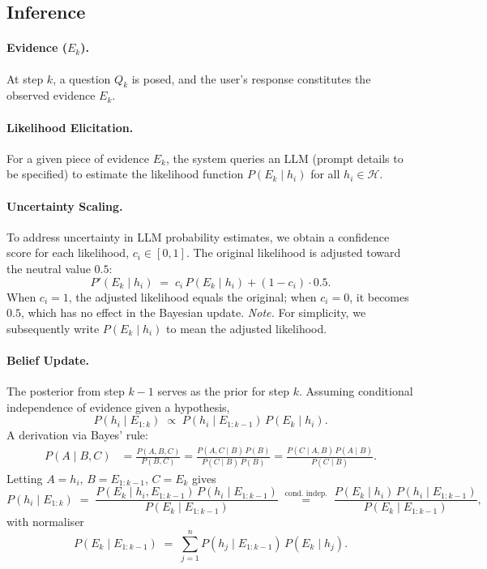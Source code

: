 \documentclass{article} %
\begin{document}
\subsection{Inference}
\paragraph{Evidence ($E_k$).}
At step $k$, a question $Q_k$ is posed, and the user's response constitutes the observed evidence $E_k$.

\paragraph{Likelihood Elicitation.}
For a given piece of evidence $E_k$, the system queries an LLM (prompt details to be specified) to estimate the likelihood function $P(E_k\mid h_i)$ for all $h_i\in\mathcal{H}$.

\paragraph{Uncertainty Scaling.}
To address uncertainty in LLM probability estimates, we obtain a confidence score for each likelihood, $c_i\in[0,1]$. The original likelihood is adjusted toward the neutral value $0.5$:
\[
P'(E_k\mid h_i) \;=\; c_i\,P(E_k\mid h_i) + (1-c_i)\cdot 0.5.
\]
When $c_i=1$, the adjusted likelihood equals the original; when $c_i=0$, it becomes $0.5$, which has no effect in the Bayesian update.
\textit{Note.} For simplicity, we subsequently write $P(E_k\mid h_i)$ to mean the adjusted likelihood.


\paragraph{Belief Update.}
The posterior from step $k-1$ serves as the prior for step $k$. Assuming conditional independence of evidence given a hypothesis,
\[
P(h_i \mid E_{1:k}) \;\propto\; P(h_i \mid E_{1:k-1})\, P(E_k \mid h_i).
\]
A derivation via Bayes' rule:
\begin{align*}
P(A\mid B,C)
  &= \frac{P(A,B,C)}{P(B,C)}
   = \frac{P(A,C\mid B)\,P(B)}{P(C\mid B)\,P(B)}
   = \frac{P(C\mid A,B)\,P(A\mid B)}{P(C\mid B)}.
\end{align*}
Letting $A=h_i$, $B=E_{1:k-1}$, $C=E_k$ gives
\[
P(h_i \mid E_{1:k}) \;=\; \frac{P(E_k \mid h_i, E_{1:k-1})\,P(h_i \mid E_{1:k-1})}{P(E_k \mid E_{1:k-1})}
\;\overset{\text{cond. indep.}}{=}\;
\frac{P(E_k \mid h_i)\,P(h_i \mid E_{1:k-1})}{P(E_k \mid E_{1:k-1})},
\]
with normaliser
\[
P(E_k \mid E_{1:k-1}) \;=\; \sum_{j=1}^{n} P(h_j \mid E_{1:k-1})\, P(E_k \mid h_j).
\]
\end{document}
